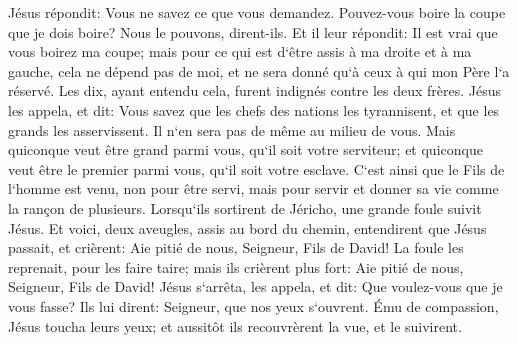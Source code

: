 \verse Jésus répondit: Vous ne savez ce que vous demandez. Pouvez-vous boire la coupe que je dois boire? Nous le pouvons, dirent-ils. 
\verse Et il leur répondit: Il est vrai que vous boirez ma coupe; mais pour ce qui est d`être assis à ma droite et à ma gauche, cela ne dépend pas de moi, et ne sera donné qu`à ceux à qui mon Père l`a réservé. 
\verse Les dix, ayant entendu cela, furent indignés contre les deux frères. 
\verse Jésus les appela, et dit: Vous savez que les chefs des nations les tyrannisent, et que les grands les asservissent. 
\verse Il n`en sera pas de même au milieu de vous. Mais quiconque veut être grand parmi vous, qu`il soit votre serviteur; 
\verse et quiconque veut être le premier parmi vous, qu`il soit votre esclave. 
\verse C`est ainsi que le Fils de l`homme est venu, non pour être servi, mais pour servir et donner sa vie comme la rançon de plusieurs. 
\verse Lorsqu`ils sortirent de Jéricho, une grande foule suivit Jésus. 
\verse Et voici, deux aveugles, assis au bord du chemin, entendirent que Jésus passait, et crièrent: Aie pitié de nous, Seigneur, Fils de David! 
\verse La foule les reprenait, pour les faire taire; mais ils crièrent plus fort: Aie pitié de nous, Seigneur, Fils de David! 
\verse Jésus s`arrêta, les appela, et dit: Que voulez-vous que je vous fasse? 
\verse Ils lui dirent: Seigneur, que nos yeux s`ouvrent. 
\verse Ému de compassion, Jésus toucha leurs yeux; et aussitôt ils recouvrèrent la vue, et le suivirent. 

